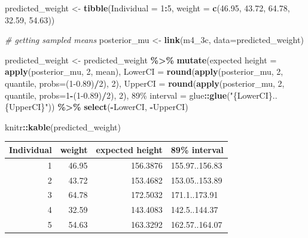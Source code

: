 \documentclass[
]{book}
\newenvironment{Shaded}{\begin{snugshade}}{\end{snugshade}}
\newcommand{\CommentTok}[1]{\textcolor[rgb]{0.56,0.35,0.01}{\textit{#1}}}
\newcommand{\DataTypeTok}[1]{\textcolor[rgb]{0.13,0.29,0.53}{#1}}
\newcommand{\DecValTok}[1]{\textcolor[rgb]{0.00,0.00,0.81}{#1}}
\newcommand{\FloatTok}[1]{\textcolor[rgb]{0.00,0.00,0.81}{#1}}
\newcommand{\KeywordTok}[1]{\textcolor[rgb]{0.13,0.29,0.53}{\textbf{#1}}}
\newcommand{\NormalTok}[1]{#1}
\newcommand{\OperatorTok}[1]{\textcolor[rgb]{0.81,0.36,0.00}{\textbf{#1}}}
\newcommand{\StringTok}[1]{\textcolor[rgb]{0.31,0.60,0.02}{#1}}
\begin{document}
\begin{Shaded}
\begin{Highlighting}[]
\NormalTok{predicted\_weight \textless{}{-}}\StringTok{ }
\StringTok{  }\KeywordTok{tibble}\NormalTok{(}\DataTypeTok{Individual =} \DecValTok{1}\OperatorTok{:}\DecValTok{5}\NormalTok{,}
         \DataTypeTok{weight =} \KeywordTok{c}\NormalTok{(}\FloatTok{46.95}\NormalTok{, }\FloatTok{43.72}\NormalTok{, }\FloatTok{64.78}\NormalTok{, }\FloatTok{32.59}\NormalTok{, }\FloatTok{54.63}\NormalTok{))}

\CommentTok{\# getting sampled means}
\NormalTok{posterior\_mu \textless{}{-}}\StringTok{ }\KeywordTok{link}\NormalTok{(m4\_3c, }\DataTypeTok{data=}\NormalTok{predicted\_weight)}

\NormalTok{predicted\_weight \textless{}{-}}\StringTok{ }\NormalTok{predicted\_weight }\OperatorTok{\%\textgreater{}\%}
\StringTok{  }\KeywordTok{mutate}\NormalTok{(}\StringTok{\textasciigrave{}}\DataTypeTok{expected height}\StringTok{\textasciigrave{}}\NormalTok{ =}\StringTok{ }\KeywordTok{apply}\NormalTok{(posterior\_mu, }\DecValTok{2}\NormalTok{, mean), }
         \DataTypeTok{LowerCI =} \KeywordTok{round}\NormalTok{(}\KeywordTok{apply}\NormalTok{(posterior\_mu, }\DecValTok{2}\NormalTok{, quantile, }\DataTypeTok{probs=}\NormalTok{(}\DecValTok{1}\FloatTok{{-}0.89}\NormalTok{)}\OperatorTok{/}\DecValTok{2}\NormalTok{), }\DecValTok{2}\NormalTok{),}
         \DataTypeTok{UpperCI =} \KeywordTok{round}\NormalTok{(}\KeywordTok{apply}\NormalTok{(posterior\_mu, }\DecValTok{2}\NormalTok{, quantile, }\DataTypeTok{probs=}\DecValTok{1}\OperatorTok{{-}}\NormalTok{(}\DecValTok{1}\FloatTok{{-}0.89}\NormalTok{)}\OperatorTok{/}\DecValTok{2}\NormalTok{), }\DecValTok{2}\NormalTok{),}
         \StringTok{\textasciigrave{}}\DataTypeTok{89\% interval}\StringTok{\textasciigrave{}}\NormalTok{ =}\StringTok{ }\NormalTok{glue}\OperatorTok{::}\KeywordTok{glue}\NormalTok{(}\StringTok{"\{LowerCI\}..\{UpperCI\}"}\NormalTok{))  }\OperatorTok{\%\textgreater{}\%}
\StringTok{  }\KeywordTok{select}\NormalTok{(}\OperatorTok{{-}}\NormalTok{LowerCI, }\OperatorTok{{-}}\NormalTok{UpperCI)}

\NormalTok{knitr}\OperatorTok{::}\KeywordTok{kable}\NormalTok{(predicted\_weight)}
\end{Highlighting}
\end{Shaded}

\begin{tabular}{r|r|r|l}
\hline
Individual & weight & expected height & 89\% interval\\
\hline
1 & 46.95 & 156.3876 & 155.97..156.83\\
\hline
2 & 43.72 & 153.4682 & 153.05..153.89\\
\hline
3 & 64.78 & 172.5032 & 171.1..173.91\\
\hline
4 & 32.59 & 143.4083 & 142.5..144.37\\
\hline
5 & 54.63 & 163.3292 & 162.57..164.07\\
\hline
\end{tabular}
\end{document}

